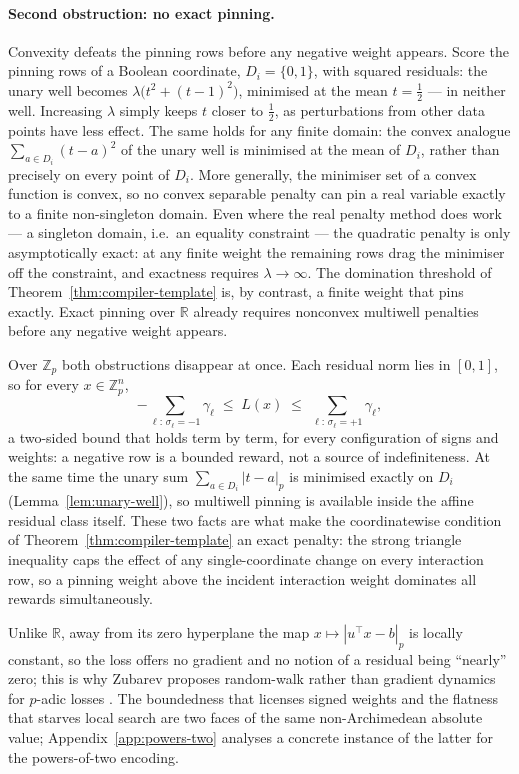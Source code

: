 \documentclass[11pt]{article}
\begin{document}
\paragraph{Second obstruction: no exact pinning.}
Convexity defeats the pinning rows before any negative weight appears.
Score the pinning rows of a Boolean coordinate, \(D_i=\{0,1\}\), with
squared residuals: the unary well becomes
$\lambda\bigl(t^{2}+(t-1)^{2}\bigr)$, minimised at the mean
$t=\tfrac12$ --- in neither well. Increasing $\lambda$ simply keeps $t$
closer to $\tfrac12$, as perturbations from other data points have less
effect. The same holds for any finite domain: the convex analogue
$\sum_{a\in D_i}(t-a)^{2}$ of the unary well is minimised at the mean
of $D_i$, rather than precisely on every point of $D_i$. More
generally, the minimiser set of a convex function is convex, so no
convex separable penalty can pin a real variable exactly to a finite
non-singleton domain. Even where the real penalty method does work ---
a singleton domain, i.e.\ an equality constraint --- the quadratic
penalty is only asymptotically exact: at any finite weight the
remaining rows drag the minimiser off the constraint, and exactness
requires $\lambda\to\infty$. The domination threshold of
Theorem~\ref{thm:compiler-template} is, by contrast, a finite weight
that pins exactly. Exact pinning over $\mathbb{R}$ already requires
nonconvex multiwell penalties before any negative weight appears.

Over $\mathbb{Z}_p$ both obstructions disappear at once. Each residual
norm lies in $[0,1]$, so for every $x\in\mathbb{Z}_p^{n}$,
\begin{equation*}
-\sum_{\ell:\,\sigma_\ell=-1}\gamma_\ell
\;\le\; L(x) \;\le\; \sum_{\ell:\,\sigma_\ell=+1}\gamma_\ell,
\end{equation*}
a two-sided bound that holds term by term, for every configuration of
signs and weights: a negative row is a bounded reward, not a source of
indefiniteness. At the same time the unary sum
$\sum_{a\in D_i}|t-a|_p$ is minimised exactly on $D_i$
(Lemma~\ref{lem:unary-well}), so
multiwell pinning is available inside the affine residual class itself.
These two facts are what make the coordinatewise condition of
Theorem~\ref{thm:compiler-template} an exact penalty: the strong triangle
inequality caps the effect of any single-coordinate change on every
interaction row, so a pinning weight above the incident interaction
weight dominates all rewards simultaneously.

Unlike $\mathbb{R}$, away from its zero hyperplane
the map $x\mapsto|u^{\top}x-b|_p$ is locally constant, so the loss
offers no gradient and no notion of a residual being ``nearly'' zero;
this is why Zubarev proposes random-walk rather than gradient dynamics
for $p$-adic losses \cite{zubarev2025padic}. The boundedness that licenses
signed weights and the flatness that starves local search are two faces
of the same non-Archimedean absolute value;
Appendix~\ref{app:powers-two} analyses a concrete instance of the latter
for the powers-of-two encoding.
\end{document}
